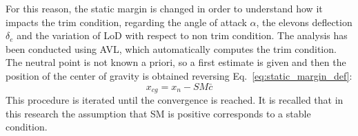 For this reason, the static margin is changed in order to understand how it impacts the trim condition, regarding the angle of attack $\alpha$, the elevons deflection $\delta_{e}$ and the variation of LoD with respect to non trim condition. 
The analysis has been conducted using AVL, which automatically computes the trim condition. 
The neutral point is not known a priori, so a first estimate is given and then the position of the center of gravity is obtained reversing Eq.~\eqref{eq:static_margin_def}:
\begin{equation}
	\label{eq:cg_func_sm}
	x_{cg} = x_n - SM\bar{c}
\end{equation}
This procedure is iterated until the convergence is reached. 
It is recalled that in this research the assumption that SM is positive corresponds to a stable condition. 


